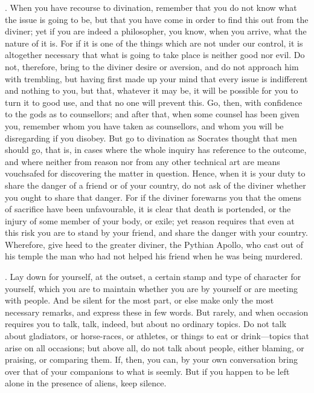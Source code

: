 . When you have recourse to divination, remember that you do not know what the issue is going to be, but that you have come in order to find this out from the diviner; yet if you are indeed a philosopher, you know, when you arrive, what the nature of it is. For if it is one of the things which are not under our control, it is altogether necessary that what is going to take place is neither good nor evil. Do not, therefore, bring to the diviner desire or aversion, and do not approach him with trembling, but having first made up your mind that every issue is indifferent and nothing to you, but that, whatever it may be, it will be possible for you to turn it to good use, and that no one will prevent this. Go, then, with confidence to the gods as to counsellors; and after that, when some counsel has been given you, remember whom you have taken as counsellors, and whom you will be disregarding if you disobey. But go to divination as Socrates thought that men should go, that is, in cases where the whole inquiry has reference to the outcome, and where neither from reason nor from any other technical art are means vouchsafed for discovering the matter in question. Hence, when it is your duty to share the danger of a friend or of your country, do not ask of the diviner whether you ought to share that danger. For if the diviner forewarns you that the omens of sacrifice have been unfavourable, it is clear that death is portended, or the injury of some member of your body, or exile; yet reason requires that even at this risk you are to stand by your friend, and share the danger with your country. Wherefore, give heed to the greater diviner, the Pythian Apollo, who cast out of his temple the man who had not helped his friend when he was being murdered.

. Lay down for yourself, at the outset, a certain stamp and type of character for yourself, which you are to maintain whether you are by yourself or are meeting with people. And be silent for the most part, or else make only the most necessary remarks, and express these in few words. But rarely, and when occasion requires you to talk, talk, indeed, but about no ordinary topics. Do not talk about gladiators, or horse-races, or athletes, or things to eat or drink—topics that arise on all occasions; but above all, do not talk about people, either blaming, or praising, or comparing them. If, then, you can, by your own conversation bring over that of your companions to what is seemly. But if you happen to be left alone in the presence of aliens, keep silence.

